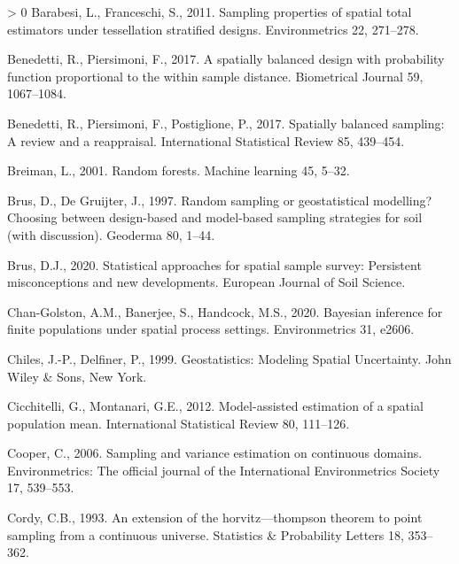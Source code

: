 \documentclass[]{elsarticle} %
\newlength{\cslhangindent}
\newenvironment{CSLReferences}[3] %
 {%
  \setlength{\parindent}{0pt}
  \ifodd #1 \everypar{\setlength{\hangindent}{\cslhangindent}}\ignorespaces\fi
  \ifnum #2 > 0
  \setlength{\parskip}{#2\baselineskip}
  \fi
 }%
 {}
\begin{document}
\hypertarget{refs}{}
\begin{CSLReferences}{1}{0}
\leavevmode\hypertarget{ref-barabesi2011sampling}{}%
Barabesi, L., Franceschi, S., 2011. Sampling properties of spatial total
estimators under tessellation stratified designs. Environmetrics 22,
271--278.

\leavevmode\hypertarget{ref-benedetti2017spatially}{}%
Benedetti, R., Piersimoni, F., 2017. A spatially balanced design with
probability function proportional to the within sample distance.
Biometrical Journal 59, 1067--1084.

\leavevmode\hypertarget{ref-benedetti2017spatiallyreview}{}%
Benedetti, R., Piersimoni, F., Postiglione, P., 2017. Spatially balanced
sampling: A review and a reappraisal. International Statistical Review
85, 439--454.

\leavevmode\hypertarget{ref-breiman2001random}{}%
Breiman, L., 2001. Random forests. Machine learning 45, 5--32.

\leavevmode\hypertarget{ref-brus1997random}{}%
Brus, D., De Gruijter, J., 1997. Random sampling or geostatistical
modelling? Choosing between design-based and model-based sampling
strategies for soil (with discussion). Geoderma 80, 1--44.

\leavevmode\hypertarget{ref-brus2020statistical}{}%
Brus, D.J., 2020. Statistical approaches for spatial sample survey:
Persistent misconceptions and new developments. European Journal of Soil
Science.

\leavevmode\hypertarget{ref-chan2020bayesian}{}%
Chan-Golston, A.M., Banerjee, S., Handcock, M.S., 2020. Bayesian
inference for finite populations under spatial process settings.
Environmetrics 31, e2606.

\leavevmode\hypertarget{ref-chiles1999geostatistics}{}%
Chiles, J.-P., Delfiner, P., 1999. Geostatistics: {Modeling Spatial
Uncertainty}. {John Wiley \& Sons}, New York.

\leavevmode\hypertarget{ref-cicchitelli2012model}{}%
Cicchitelli, G., Montanari, G.E., 2012. Model-assisted estimation of a
spatial population mean. International Statistical Review 80, 111--126.

\leavevmode\hypertarget{ref-cooper2006sampling}{}%
Cooper, C., 2006. Sampling and variance estimation on continuous
domains. Environmetrics: The official journal of the International
Environmetrics Society 17, 539--553.

\leavevmode\hypertarget{ref-cordy1993extension}{}%
Cordy, C.B., 1993. An extension of the horvitz---thompson theorem to
point sampling from a continuous universe. Statistics \& Probability
Letters 18, 353--362.


\end{CSLReferences}
\end{document}
